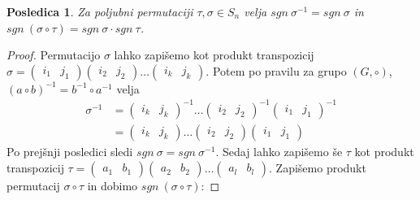 \documentclass[10pt, a4paper]{article}
\newtheorem{posledica}[izr]{Posledica}
\newenvironment{noticeC}{%
  \tcolorbox[%
  notitle,
  empty,
  enhanced,  %
  breakable,
  coltext=black, 
  fontupper=\rmfamily,
  parbox=false,
  noparskip,
  sharp corners,
  boxrule=-1pt,  %
  frame hidden,
  left=7pt,  %
  right=7pt,
  top=5pt,
  bottom=5pt,
  before skip=2.5ex plus 2pt,
  after skip=2.5ex plus 2pt,
  overlay unbroken and last={%
  },
  ]}
{\endtcolorbox}
\newenvironment{dokaz}%
  {\begin{noticeC}\begin{proof}}%
  {\end{proof}\end{noticeC}}
\begin{document}
\begin{posledica}
    Za poljubni permutaciji $\tau, \sigma \in S_n$ velja
        $sgn\ \sigma^{-1} = sgn\ \sigma$ in
        $sgn\ (\sigma \circ \tau) = sgn\ \sigma \cdot sgn\ \tau$.
\end{posledica}

\begin{dokaz}
    Permutacijo $\sigma$ lahko zapišemo kot produkt transpozicij
    $\sigma = \begin{pmatrix}
        i_1 & j_1
    \end{pmatrix} \begin{pmatrix}
        i_2 & j_2
    \end{pmatrix} \dots \begin{pmatrix}
        i_k & j_k
    \end{pmatrix}.$
    Potem po pravilu za grupo $(G, \circ)$, $(a \circ b)^{-1} = b^{-1} \circ a^{-1}$ velja
    \begin{align*}
        \sigma^{-1} &=  \begin{pmatrix}
        i_k & j_k
        \end{pmatrix}^{-1}
        \dots
        \begin{pmatrix}
            i_2 & j_2
        \end{pmatrix}^{-1} 
        \begin{pmatrix}
            i_1 & j_1
        \end{pmatrix}^{-1}\\
        &= \begin{pmatrix}
            i_k & j_k
        \end{pmatrix}
        \dots
        \begin{pmatrix}
            i_2 & j_2
        \end{pmatrix}
        \begin{pmatrix}
            i_1 & j_1
        \end{pmatrix}
    \end{align*}
    Po prejšnji posledici sledi $sgn\ \sigma = sgn\ \sigma^{-1}$.
    Sedaj lahko zapišemo še $\tau$ kot produkt transpozicij
    $\tau = \begin{pmatrix}
        a_1 & b_1
    \end{pmatrix} \begin{pmatrix}
        a_2 & b_2
    \end{pmatrix} \dots \begin{pmatrix}
        a_l & b_l
    \end{pmatrix}.$
    Zapišemo produkt permutacij $\sigma \circ \tau$ in dobimo $sgn\ (\sigma \circ \tau)$:

\end{dokaz}
\end{document}
